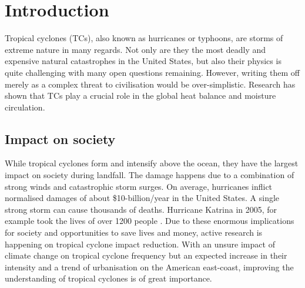 




\chapter{Introduction}\label{sec:introduction}
Tropical cyclones (TCs), also known as hurricanes or typhoons, are storms of extreme nature in many regards. Not only are they the most deadly and expensive natural catastrophes in the United States, but also their physics is quite challenging with many open questions remaining\cite{emanuel-summ}.
However, writing them off merely as a complex threat to civilisation would be over-simplistic. Research has shown that TCs play a crucial role in the global heat balance and moisture circulation\cite{moisture-transport}\cite{global-heat}.

\section{Impact on society}\label{sec:society}
While tropical cyclones form and intensify above the ocean, they have the largest impact on society during landfall. The damage happens due to a combination of strong winds and catastrophic storm surges. On average, hurricanes inflict normalised damages of about \$10-billion/year in the United States\cite{damage-norm}. A single strong storm can cause thousands of deaths. Hurricane Katrina in 2005, for example took the lives of over 1200 people \cite{hurr-2005}.
Due to these enormous implications for society and opportunities to save lives and money, active research is happening on tropical cyclone impact reduction. With an unsure impact of climate change on tropical cyclone frequency but an expected increase in their intensity and a trend of urbanisation on the American east-coast, improving the understanding of tropical cyclones is of great importance.

